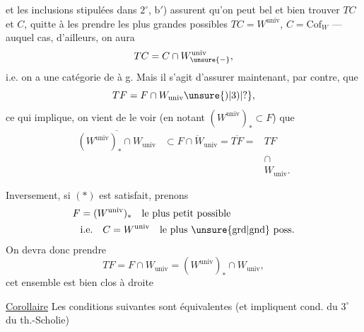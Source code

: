 
et les  inclusions stipulées dans $2^\circ$, b$'$)
assurent qu'on peut bel et bien trouver
$TC$ et $C$, quitte à les prendre les
plus grandes possibles $TC=W^{\mathrm{univ}}$, $C=\mathrm{Cof}_W$
--- auquel cas, d'ailleurs, on aura
\[
 TC=C\cap W^{\mathrm{univ}}_{\unsure{-}},
\]
i.e. on a une catégorie de  à
g. Mais il s'agit d'assurer maintenant,
par contre, que
\[
 TF=F\cap W_{\mathrm{univ}}\unsure{)|3)|?},
\]
ce qui implique, on vient de le voir \unsure{$*$} (en
notant $(W^{\mathrm{univ}})_*\subset F$) que
\[
 \begin{aligned}
 \overline{(W^{\mathrm{univ}})_*\cap W_{\mathrm{univ}}}
 &\subset\overline{F\cap W_{\mathrm{univ}}}=\overline{TF}={}&TF\\[-2pt]
 &&\cap\\[-2pt]&&W_{\mathrm{univ}}.
 \end{aligned}\tag*{($*$)}
\]

Inversement, si $(*)$ est satisfait, prenons
\[
 \begin{aligned}
 F&=(W^{\mathrm{univ}})_*\quad\text{le plus petit possible}\\
 &\text{i.e.}\quad C=W^{\mathrm{univ}}\quad\text{le plus \unsure{grd|gnd} poss.}
 \end{aligned}
\]
On devra donc prendre
\[
 TF=F\cap W_{\mathrm{univ}}=(W^{\mathrm{univ}})_*\cap W_{\mathrm{univ}},
\]
  cet ensemble est bien clos à droite 
 

\uline{Corollaire}  Les conditions suivantes  sont
équivalentes (et impliquent  cond. du $3^\circ$ du th.-Scholie)
